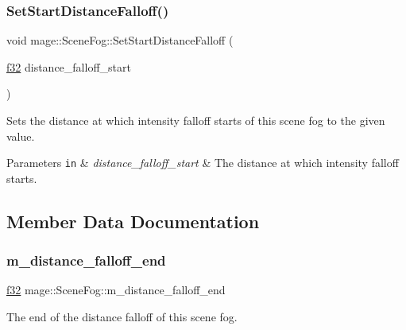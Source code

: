 \subsubsection{\texorpdfstring{Set\+Start\+Distance\+Falloff()}{SetStartDistanceFalloff()}}
{\footnotesize\ttfamily void mage\+::\+Scene\+Fog\+::\+Set\+Start\+Distance\+Falloff (\begin{DoxyParamCaption}\item[{\hyperlink{namespacemage_a6a44ad388483959dc4dff9f2aef91431}{f32}}]{distance\+\_\+falloff\+\_\+start }\end{DoxyParamCaption})\hspace{0.3cm}{\ttfamily [noexcept]}}

Sets the distance at which intensity falloff starts of this scene fog to the given value.


\begin{DoxyParams}[1]{Parameters}
\mbox{\tt in}  & {\em distance\+\_\+falloff\+\_\+start} & The distance at which intensity falloff starts. \\
\hline
\end{DoxyParams}


\subsection{Member Data Documentation}
\hypertarget{structmage_1_1_scene_fog_ab16014aa8c1e6f4a9e8edc168bc9b4ed}{}\label{structmage_1_1_scene_fog_ab16014aa8c1e6f4a9e8edc168bc9b4ed} 
\subsubsection{\texorpdfstring{m\+\_\+distance\+\_\+falloff\+\_\+end}{m\_distance\_falloff\_end}}
{\footnotesize\ttfamily \hyperlink{namespacemage_a6a44ad388483959dc4dff9f2aef91431}{f32} mage\+::\+Scene\+Fog\+::m\+\_\+distance\+\_\+falloff\+\_\+end\hspace{0.3cm}{\ttfamily [private]}}

The end of the distance falloff of this scene fog. \hypertarget{structmage_1_1_scene_fog_a81cbca73f4f077ff11da8c8fd781623e}{}\label{structmage_1_1_scene_fog_a81cbca73f4f077ff11da8c8fd781623e} 
